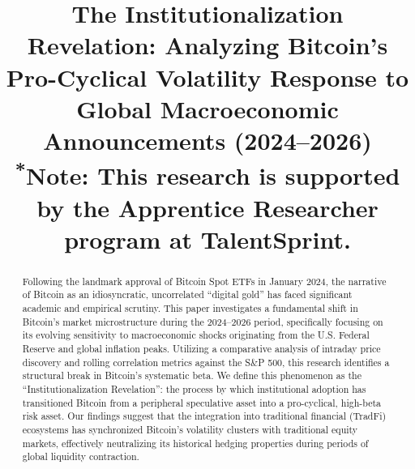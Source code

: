 \documentclass[10pt, conference, compsocconf]{IEEEtran}
\begin{document}

\title{The Institutionalization Revelation: Analyzing Bitcoin’s Pro-Cyclical Volatility Response to Global Macroeconomic Announcements (2024--2026)\\
{\footnotesize \textsuperscript{*}Note: This research is supported by the Apprentice Researcher program at TalentSprint.}
}

\author{
}

\maketitle

\begin{abstract}
Following the landmark approval of Bitcoin Spot ETFs in January 2024, the narrative of Bitcoin as an idiosyncratic, uncorrelated ``digital gold'' has faced significant academic and empirical scrutiny. This paper investigates a fundamental shift in Bitcoin’s market microstructure during the 2024--2026 period, specifically focusing on its evolving sensitivity to macroeconomic shocks originating from the U.S. Federal Reserve and global inflation peaks. Utilizing a comparative analysis of intraday price discovery and rolling correlation metrics against the S\&P 500, this research identifies a structural break in Bitcoin's systematic beta. We define this phenomenon as the ``Institutionalization Revelation'': the process by which institutional adoption has transitioned Bitcoin from a peripheral speculative asset into a pro-cyclical, high-beta risk asset. Our findings suggest that the integration into traditional financial (TradFi) ecosystems has synchronized Bitcoin’s volatility clusters with traditional equity markets, effectively neutralizing its historical hedging properties during periods of global liquidity contraction.
\end{abstract}
\end{document}
